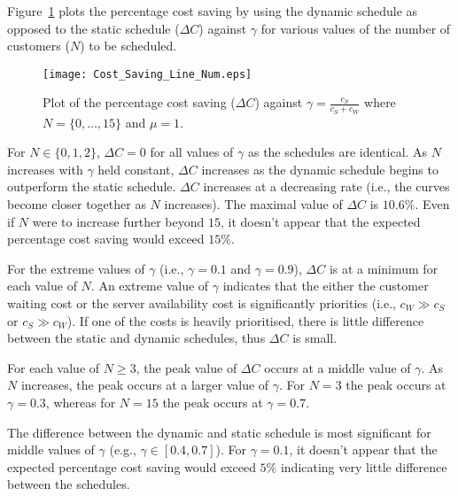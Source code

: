 Figure~\ref{Graph_Cost_Saving} plots the percentage cost saving by using the dynamic schedule as opposed to the static schedule ($\Delta C$) against $\gamma$ for various values of the number of customers ($N$) to be scheduled. 
\begin{figure}[htb]
	\centering
	\texttt{[image: Cost\_Saving\_Line\_Num.eps]}
	\caption{Plot of the percentage cost saving ($\Delta C$) against $\gamma = \frac{c_{S}}{c_{S} + c_{W}}$ where $N = \{ 0, \ldots, 15 \}$ and $\mu = 1$.}
	\label{Graph_Cost_Saving}
\end{figure}

For $N \in \{ 0, 1, 2 \}$, $\Delta C = 0$ for all values of $\gamma$ as the schedules are identical. As $N$ increases with $\gamma$ held constant, $\Delta C$ increases as the dynamic schedule begins to outperform the static schedule. $\Delta C$ increases at a decreasing rate (i.e., the curves become closer together as $N$ increases). The maximal value of $\Delta C$ is $10.6 \%$. Even if $N$ were to increase further beyond $15$, it doesn't appear that the expected percentage cost saving would exceed $15 \%$.

For the extreme values of $\gamma$ (i.e., $\gamma = 0.1$ and $\gamma = 0.9$), $\Delta C$ is at a minimum for each value of $N$. An extreme value of $\gamma$ indicates that the either the customer waiting cost or the server availability cost is significantly priorities (i.e., $c_{W} \gg c_{S}$ or $c_{S} \gg c_{W}$). If one of the costs is heavily prioritised, there is little difference between the static and dynamic schedules, thus $\Delta C$ is small.

For each value of $N \geq 3$, the peak value of $\Delta C$ occurs at a middle value of $\gamma$. As $N$ increases, the peak occurs at a larger value of $\gamma$. For $N = 3$ the peak occurs at $\gamma = 0.3$, whereas for $N = 15$ the peak occurs at $\gamma = 0.7$.

The difference between the dynamic and static schedule is most significant for middle values of $\gamma$ (e.g., $\gamma \in [0.4, 0.7]$). For $\gamma = 0.1$, it doesn't appear that the expected percentage cost saving would exceed $5 \%$ indicating very little difference between the schedules.